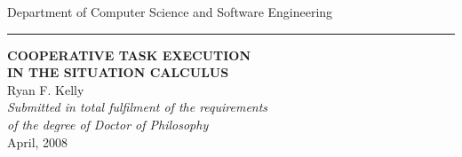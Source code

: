 \documentclass[a4paper,twoside,12pt,openany]{book}
\begin{document}

\begin{titlepage}
\begin{center}
{\Large Department of Computer Science and Software Engineering}\\ \vspace{0.1cm}
\rule{150mm}{0.5mm}

\vspace{1cm}
{\bf\LARGE   COOPERATIVE TASK EXECUTION }\\ \vspace{0.3cm} %
{\bf\LARGE   IN THE SITUATION CALCULUS } \\ %
\vspace{2cm}
{\LARGE      Ryan F. Kelly       }\\
\vspace{5cm}
{\em\large Submitted in total fulfilment of the requirements}\\ \vspace{0.1cm}
{\em\large        of the degree of Doctor of Philosophy     }\\
\vspace{0.5cm}
{\Large             April, 2008        }\\
\vspace{0.5cm}
\end{center}
\end{titlepage}






\end{document}
